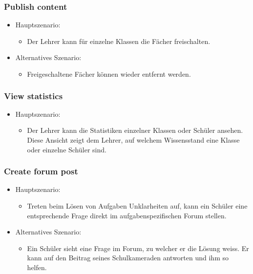 \subsubsection*{Publish content}
\begin{itemize}
	\item Hauptszenario:
	\begin{itemize}
		\item Der Lehrer kann für einzelne Klassen die Fächer freischalten.
	\end{itemize}
	\item Alternatives Szenario:
	\begin{itemize}
		\item Freigeschaltene Fächer können wieder entfernt werden.
	\end{itemize}
\end{itemize}



\subsubsection*{View statistics}
\begin{itemize}
	\item Hauptszenario:
	\begin{itemize}
		\item Der Lehrer kann die Statistiken einzelner Klassen oder Schüler ansehen. Diese Ansicht zeigt dem Lehrer, auf welchem Wissensstand eine Klasse oder einzelne Schüler sind.
	\end{itemize}
\end{itemize}


\subsubsection*{Create forum post}
\begin{itemize}
	\item Hauptszenario:
	\begin{itemize}
		\item Treten beim Lösen von Aufgaben Unklarheiten auf, kann ein Schüler eine entsprechende Frage direkt im aufgabenspezifischen Forum stellen.
	\end{itemize}
	\item Alternatives Szenario:
	\begin{itemize}
		\item Ein Schüler sieht eine Frage im Forum, zu welcher er die Lösung weiss. Er kann auf den Beitrag seines Schulkameraden antworten und ihm so helfen.
	\end{itemize}
\end{itemize}


